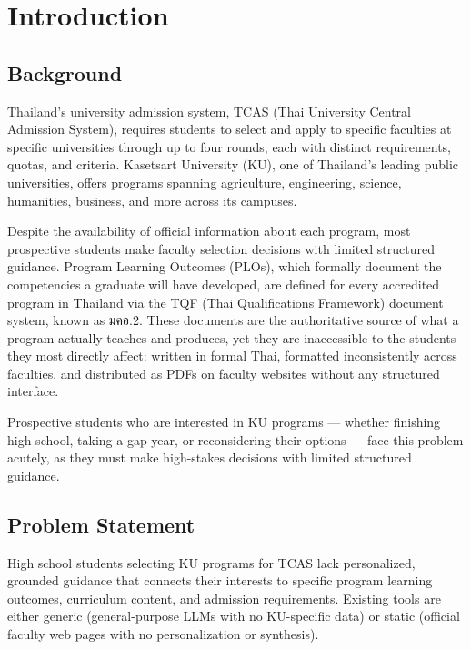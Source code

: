 \chapter{Introduction}
\label{chap:introduction}

\section{Background}
\label{section:background}

Thailand's university admission system, TCAS (Thai University Central Admission System), requires students to select and apply to specific faculties at specific universities through up to four rounds, each with distinct requirements, quotas, and criteria. Kasetsart University (KU), one of Thailand's leading public universities, offers programs spanning agriculture, engineering, science, humanities, business, and more across its campuses.

Despite the availability of official information about each program, most prospective students make faculty selection decisions with limited structured guidance. Program Learning Outcomes (PLOs), which formally document the competencies a graduate will have developed, are defined for every accredited program in Thailand via the TQF (Thai Qualifications Framework) document system, known as มคอ.2. These documents are the authoritative source of what a program actually teaches and produces, yet they are inaccessible to the students they most directly affect: written in formal Thai, formatted inconsistently across faculties, and distributed as PDFs on faculty websites without any structured interface.

Prospective students who are interested in KU programs --- whether finishing high school, taking a gap year, or reconsidering their options --- face this problem acutely, as they must make high-stakes decisions with limited structured guidance.

\section{Problem Statement}
\label{section:problem-statement}

High school students selecting KU programs for TCAS lack personalized, grounded guidance that connects their interests to specific program learning outcomes, curriculum content, and admission requirements. Existing tools are either generic (general-purpose LLMs with no KU-specific data) or static (official faculty web pages with no personalization or synthesis).

